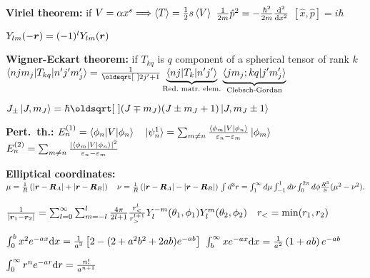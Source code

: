\begin{squishlist}
    \item \textbf{Viriel theorem:} if $V = \alpha x^s \Longrightarrow \braket{T} = \frac{1}{2}s \braket{V}$
    \squishsep $\frac{1}{2m}\hat{p}^2 = - \frac{\hbar^2}{2m} \dder{x}{}$
    \qquad $[\hat{x}, \hat{p}] = i \hbar$
    \item $Y_{lm}(-\vr) = (-1)^l Y_{lm}(\vr)$
    \item \textbf{Wigner-Eckart theorem:} if $T_{kq}$ is $q$ component of a spherical tensor of rank $k$ \\
    $\braket{n j m_j | T_{kq} | n' j' m_j'} = \frac{1}{\sqrt{2j'+1}} \underbrace{\braket{n j | T_k | n'j'}}_{\text{Red.\ matr.\ elem.}} \underbrace{\braket{j m_j ; k q | j' m_j'}}_{\text{Clebsch-Gordan}}$

    \item $J_{\pm} \ket{J,m_J} = \hbar \sqrt{(J \mp m_J)(J \pm m_J + 1)} \ket{J,m_J \pm 1 }$
    \item \textbf{Pert.\ th.:} $E_n^{(1)}=\braket{\phi_n|V|\phi_n} \quad \ket{\psi^1_n} = \sum_{m\neq n}\frac{\braket{\phi_m|V|\phi_n}}{\varepsilon_n - \varepsilon_m} \ket{\phi_m}$ \quad
    $E_n^{(2)} = \sum_{m\neq n}\frac{|\braket{\phi_m|V|\phi_n}|^2}{\varepsilon_n - \varepsilon_m}$
    \item \textbf{Elliptical coordinates:} $\mu = \frac{1}{R} \left(|\vec{r}-\vec{R}_A| + | \vec{r} - \vec{R}_B| \right) \quad 
    \nu = \frac{1}{R} \left(|\vec{r}-\vec{R}_A| - | \vec{r} - \vec{R}_B| \right) \\
    \int d^3r = \int_1^\infty d\mu \int_{-1}^1 d \nu \int_0^{2\pi} d \phi \frac{R^3}{8} ( \mu^2 - \nu^2).$
    \item $\frac{1}{|\vr_1 - \vr_2|} = \sum_{l=0}^{\infty} \sum_{m=-l}^{l} \frac{4\pi}{2l+1} \frac{r_<^l}{r_>^{l+1}} Y_l^{-m}(\theta_1, \phi_1) Y_l^{m}(\theta_2, \phi_2) \quad r_< = \min(r_1,r_2)$
\end{squishlist}

\begin{squishlist}
    \item $\int_{0}^{b} x^2 e^{-ax} \ud x = \frac{1}{a^3}\left[2 - (2 + a^2 b^2 + 2ab)e^{-ab}\right]$ 
    \squishsep $\int_{b}^{\infty} x e^{-ax} \ud x = \frac{1}{a^2} \left(1 + ab\right)e^{-ab}$
    \item $\int_{0}^{\infty} r^n e^{-ar} \ud r = \frac{n!}{a^{n+1}}$
\end{squishlist}